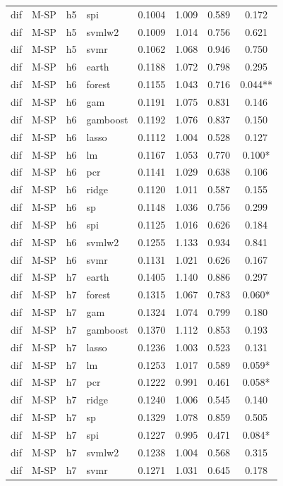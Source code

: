 \begin{ThreePartTable}
\begin{longtable}[t]{llclcccc}
dif & M-SP & h5 & spi & 0.1004 & 1.009 & 0.589 & 0.172\\
dif & M-SP & h5 & svmlw2 & 0.1009 & 1.014 & 0.756 & 0.621\\
dif & M-SP & h5 & svmr & 0.1062 & 1.068 & 0.946 & 0.750\\
\addlinespace
dif & M-SP & h6 & earth & 0.1188 & 1.072 & 0.798 & 0.295\\
dif & M-SP & h6 & forest & 0.1155 & 1.043 & 0.716 & 0.044**\\
dif & M-SP & h6 & gam & 0.1191 & 1.075 & 0.831 & 0.146\\
dif & M-SP & h6 & gamboost & 0.1192 & 1.076 & 0.837 & 0.150\\
dif & M-SP & h6 & lasso & 0.1112 & 1.004 & 0.528 & 0.127\\
dif & M-SP & h6 & lm & 0.1167 & 1.053 & 0.770 & 0.100*\\
dif & M-SP & h6 & pcr & 0.1141 & 1.029 & 0.638 & 0.106\\
dif & M-SP & h6 & ridge & 0.1120 & 1.011 & 0.587 & 0.155\\
dif & M-SP & h6 & sp & 0.1148 & 1.036 & 0.756 & 0.299\\
dif & M-SP & h6 & spi & 0.1125 & 1.016 & 0.626 & 0.184\\
dif & M-SP & h6 & svmlw2 & 0.1255 & 1.133 & 0.934 & 0.841\\
dif & M-SP & h6 & svmr & 0.1131 & 1.021 & 0.626 & 0.167\\
\addlinespace
dif & M-SP & h7 & earth & 0.1405 & 1.140 & 0.886 & 0.297\\
dif & M-SP & h7 & forest & 0.1315 & 1.067 & 0.783 & 0.060*\\
dif & M-SP & h7 & gam & 0.1324 & 1.074 & 0.799 & 0.180\\
dif & M-SP & h7 & gamboost & 0.1370 & 1.112 & 0.853 & 0.193\\
dif & M-SP & h7 & lasso & 0.1236 & 1.003 & 0.523 & 0.131\\
dif & M-SP & h7 & lm & 0.1253 & 1.017 & 0.589 & 0.059*\\
dif & M-SP & h7 & pcr & 0.1222 & 0.991 & 0.461 & 0.058*\\
dif & M-SP & h7 & ridge & 0.1240 & 1.006 & 0.545 & 0.140\\
dif & M-SP & h7 & sp & 0.1329 & 1.078 & 0.859 & 0.505\\
dif & M-SP & h7 & spi & 0.1227 & 0.995 & 0.471 & 0.084*\\
dif & M-SP & h7 & svmlw2 & 0.1238 & 1.004 & 0.568 & 0.315\\
dif & M-SP & h7 & svmr & 0.1271 & 1.031 & 0.645 & 0.178\\

\end{longtable}
\end{ThreePartTable}
